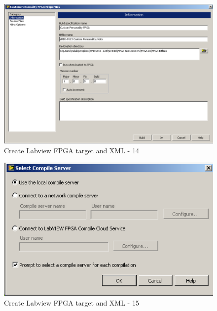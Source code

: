 \documentclass[a4paper,english]{report}
\begin{document}
\begin{figure}[htb!]
	\centering \includegraphics[scale=0.45]{Screenshots/Screenshot_2015-01-16_19-53-01.png}
	\caption{Create Labview FPGA target and XML - 14}
	\label{fig: Create Labview FPGA target and XML-14} 
\end{figure}
\begin{figure}[htb!]
	\centering \includegraphics[scale=0.45]{Screenshots/Screenshot_2015-01-16_19-53-25.png}
	\caption{Create Labview FPGA target and XML - 15}
	\label{fig: Create Labview FPGA target and XML-15} 
\end{figure}
\end{document}
